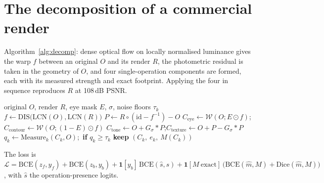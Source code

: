 \documentclass[10pt]{article}
\begin{document}
\section{The decomposition of a commercial render}
\label{sec:decomp}
Algorithm~\ref{alg:decomp}: dense optical flow on locally normalised luminance gives the warp $f$ between an original $O$ and its
render $R$, the photometric residual is taken in the geometry of $O$, and four single-operation components are formed, each with
its measured strength and exact footprint. Applying the four in sequence reproduces $R$ at 108\,dB PSNR.
\begin{algorithm}[H]
\caption{Single-operation components of a commercial render}
\label{alg:decomp}
\begin{algorithmic}[1]
\Require original $O$, render $R$, eye mask $E$, $\sigma$, noise floors $\tau_k$
\State $f\gets\mathrm{DIS}\big(\mathrm{LCN}(O),\mathrm{LCN}(R)\big)$
\State $P\gets R\circ(\mathrm{id}-f^{-1}) - O$
\State $C_\text{eye}\gets\mathcal{W}(O;E\odot f)$;\quad $C_\text{contour}\gets\mathcal{W}(O;(1-E)\odot f)$
\State $C_\text{tone}\gets O+G_\sigma*P$;\quad $C_\text{texture}\gets O+P-G_\sigma*P$
 \State $q_k\gets\mathrm{Measure}_k(C_k,O)$;\ \textbf{if} $q_k\ge\tau_k$ \textbf{keep} $(C_k,\ e_k,\ M(C_k))$
\EndFor
\end{algorithmic}
\end{algorithm}
The loss is $\mathcal{L}=\mathrm{BCE}(z_f,y_f)+\mathrm{BCE}(z_b,y_b)+\mathbf{1}[y_b]\,\mathrm{BCE}(\hat s,s)+\mathbf{1}[M\
\text{exact}]\,\big(\mathrm{BCE}(\hat m,M)+\mathrm{Dice}(\hat m,M)\big)$, with $\hat s$ the operation-presence logits.
\end{document}
